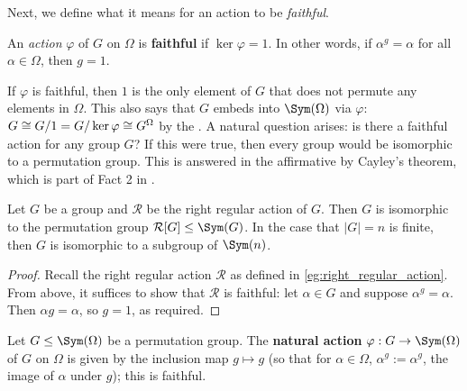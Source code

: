 Next, we define what it means for an action to be \textit{faithful}.

\begin{definition}\label{def:faithful_action}
    An \textit{action} $\varphi$ of $G$ on $\Omega$ is \textbf{faithful} if $\ker\varphi = 1$. In other words, if $\alpha^g = \alpha$ for all $\alpha \in \Omega$, then $g = 1$.
\end{definition}

If $\varphi$ is faithful, then $1$ is the only element of $G$ that does not permute any elements in $\Omega$. This also says that $G$ embeds into $\Sym(\Omega)$ via $\varphi$: $G \cong G/1 = G/\ker\varphi \cong \added{1}{G^\Omega}$ by the . A natural question arises: is there a faithful action for any group $G$? If this were true, then every group would be isomorphic to a permutation group. This is answered in the affirmative by Cayley's theorem, which is part of Fact 2 in \cite{blaha1992}.

\begin{theorem}[Cayley]\label{thm:cayley}
    Let $G$ be a group and $\mathcal{R}$ be the right regular action of $G$. Then $G$ is isomorphic to the permutation group $\mathcal{R}[G] \leq \Sym(G)$. In the case that $|G| = n$ is finite, then $G$ is isomorphic to a subgroup of $\Sym(n)$.
\end{theorem}

\begin{proof}
    Recall the right regular action $\mathcal{R}$ as defined in \autoref{eg:right_regular_action}. From above, it suffices to show that $\mathcal{R}$ is faithful: let $\alpha \in G$ and suppose $\alpha^g = \alpha$. Then $\alpha g = \alpha$, so  $g = 1$, as required.
\end{proof}

\begin{example}\label{eg:natural_action}
    Let $G \leq \Sym(\Omega)$ be a permutation group. The \textbf{natural action} $\varphi : G \to \Sym(\Omega)$ of $G$ on $\Omega$ is given by the inclusion map $g \mapsto g$ (so that for $\alpha \in \Omega$, $\alpha^g := \alpha^g$, the image of $\alpha$ under $g$); this is faithful.
\end{example}

